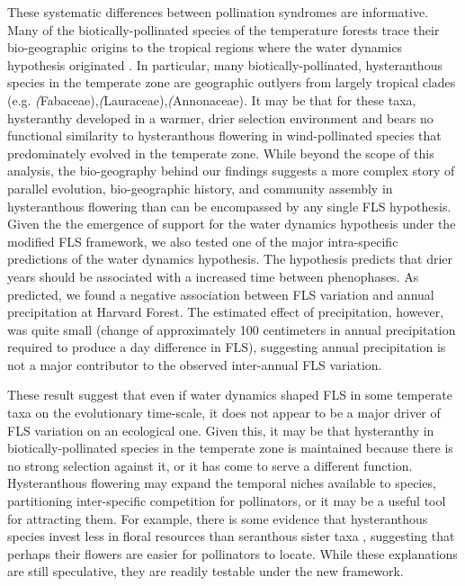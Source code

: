 \documentclass{article}
\begin{document}
\noindent These systematic differences between pollination syndromes are informative. Many of the biotically-pollinated species of the temperature forests trace their bio-geographic origins to the tropical regions \citep{Daubenmire1972} where the water dynamics hypothesis originated \citep{Janzen1967,Franklin2016}. In particular, many biotically-pollinated, hysteranthous species in the temperate zone are geographic outlyers from largely tropical clades (e.g. \textit(Fabaceae),\textit(Lauraceae),\textit(Annonaceae). It may be that for these taxa, hysteranthy developed in a warmer, drier selection environment and bears no functional similarity to hysteranthous flowering in wind-pollinated species that predominately evolved in the temperate zone. While beyond the scope of this analysis, the bio-geography behind our findings suggests a more complex story of parallel evolution, bio-geographic history, and community assembly in hysteranthous flowering than can be encompassed by any single FLS hypothesis.\\

\noindent Given the the emergence of support for the water dynamics hypothesis under the modified FLS framework, we also tested one of the major intra-specific predictions of the water dynamics hypothesis. The hypothesis predicts that drier years should be associated with a increased time between phenophases. As predicted, we found a negative association between FLS variation and annual precipitation at Harvard Forest. The estimated effect of precipitation, however, was quite small (change of approximately 100 centimeters in annual precipitation required to produce a day difference in FLS), suggesting annual precipitation is not a major contributor to the observed inter-annual FLS variation.

\noindent These result suggest that even if water dynamics shaped FLS in some temperate taxa on the evolutionary time-scale, it does not appear to be a major driver of FLS variation on an ecological one. Given this, it may be that hysteranthy in biotically-pollinated species in the temperate zone is maintained because there is no strong selection against it, or it has come to serve a different function. Hysteranthous flowering may expand the temporal niches available to species, partitioning inter-specific competition for pollinators, or it may be a useful tool for attracting them. For example, there is some evidence that hysteranthous species invest less in floral resources than seranthous sister taxa \citep{Gunatilleke1984}, suggesting that perhaps their flowers are easier for pollinators to locate. While these explanations are still speculative, they are readily testable under the new framework.\\
\end{document}
